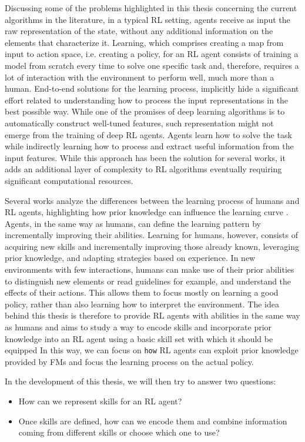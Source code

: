 Discussing some of the problems highlighted in this thesis concerning the current algorithms in the literature, in a typical RL setting, agents receive as input the raw representation of the state, without any additional information on the elements that characterize it.
Learning, which comprises creating a map from input to action space, i.e. creating a policy,  for an RL agent consists of training a model from scratch every time to solve one specific task and, therefore, requires a lot of interaction with the environment to perform well, much more than a human.
End-to-end solutions for the learning process, implicitly hide a significant effort related to understanding how to process the input representations in the best possible way.
While one of the promises of deep learning algorithms is to automatically construct well-tuned features, such representation might not emerge from the training of deep RL agents. 
Agents learn how to solve the task while indirectly learning how to process and extract useful information from the input features. 
While this approach has been the solution for several works, it adds an additional layer of complexity to RL algorithms eventually requiring significant computational resources.

Several works analyze the differences between the learning process of humans and RL agents, highlighting how prior knowledge can influence the learning curve \citep{lake2017building, dubey2018investigating}.
Agents, in the same way as humans, can define the learning pattern by incrementally improving their abilities.
Learning for humans, however, consists of acquiring new skills and incrementally improving those already known, leveraging prior knowledge, and adapting strategies based on experience.
In new environments with few interactions, humans can make use of their prior abilities to distinguish new elements or read guidelines for example, and understand the effects of their actions. This allows them to focus mostly on learning a good policy, rather than also learning how to interpret the environment. 
The idea behind this thesis is therefore to provide RL agents with abilities in the same way as humans and aims to study a way to encode skills and incorporate prior knowledge into an RL agent using a basic skill set with which it should be equipped
In this way, we can focus on \texttt{how} RL agents can exploit prior knowledge provided by FMs and focus the learning process on the actual policy.

In the development of this thesis, we will then try to answer two questions:
\begin{itemize}
    \item How can we represent skills for an RL agent?
    \item Once skills are defined, how can we encode them and combine information coming from different skills or choose which one to use?
\end{itemize}

